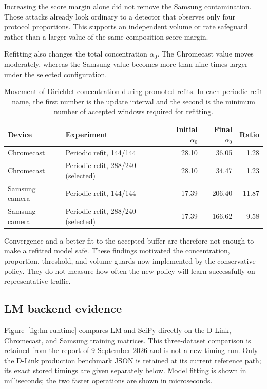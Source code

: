 Increasing the score margin alone did not remove the Samsung contamination.
Those attacks already look ordinary to a detector that observes only four
protocol proportions. This supports an independent volume or rate safeguard
rather than a larger value of the same composition-score margin.

Refitting also changes the total concentration $\alpha_0$. The Chromecast value
moves moderately, whereas the Samsung value becomes more than nine times larger
under the selected configuration.

\begin{table}[H]
\centering
\small
\begin{tabularx}{\textwidth}{l>{\raggedright\arraybackslash}Xrrr}
\toprule
\textbf{Device} & \textbf{Experiment} & \textbf{Initial $\alpha_0$} &
\textbf{Final $\alpha_0$} & \textbf{Ratio} \\
\midrule
Chromecast & Periodic refit, 144/144 & 28.10 & 36.05 & 1.28 \\
Chromecast & Periodic refit, 288/240 (selected) & 28.10 & 34.47 & 1.23 \\
Samsung camera & Periodic refit, 144/144 & 17.39 & 206.40 & 11.87 \\
Samsung camera & Periodic refit, 288/240 (selected) & 17.39 & 166.62 & 9.58 \\
\bottomrule
\end{tabularx}
\caption{Movement of Dirichlet concentration during promoted refits. In each
periodic-refit name, the first number is the update interval and the second is
the minimum number of accepted windows required for refitting.}
\label{tab:alpha-movement}
\end{table}

Convergence and a better fit to the accepted buffer are therefore not enough to
make a refitted model safe. These findings motivated the concentration, proportion, threshold, and volume
guards now implemented by the conservative policy. They do not measure how
often the new policy will learn successfully on representative traffic.

\subsection{LM backend evidence}

Figure~\ref{fig:lm-runtime} compares LM and SciPy directly on the D-Link,
Chromecast, and Samsung training matrices. This three-dataset comparison is retained from the report of
9 September 2026 and is not a new timing run. Only the D-Link production
benchmark JSON is retained at its current reference path; its exact stored
timings are given separately below. Model fitting is
shown in milliseconds; the two faster operations are shown in microseconds.

